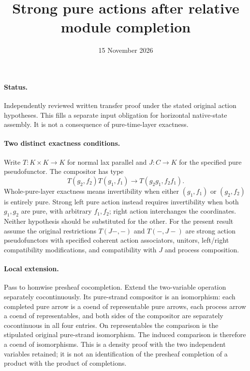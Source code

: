 \documentclass{article}
\title{Strong pure actions after relative module completion}
\date{15 November 2026}
\begin{document}
\maketitle
\paragraph{Status.} Independently reviewed written transfer proof under the stated original action hypotheses. This fills a separate input obligation for horizontal native-state assembly. It is not a consequence of pure-time-layer exactness.

\paragraph{Two distinct exactness conditions.} Write $T:K\times K\to K$ for normal lax parallel and $J:C\to K$ for the specified pure pseudofunctor. The compositor has type
\[
 T(g_2,f_2)T(g_1,f_1)\longrightarrow T(g_2g_1,f_2f_1).
\]
Whole-pure-layer exactness means invertibility when either $(g_1,f_1)$ or $(g_2,f_2)$ is entirely pure. Strong left pure action instead requires invertibility when both $g_1,g_2$ are pure, with arbitrary $f_1,f_2$; right action interchanges the coordinates. Neither hypothesis should be substituted for the other. For the present result assume the original restrictions $T(J-, -)$ and $T(-,J-)$ are strong action pseudofunctors with specified coherent action associators, unitors, left/right compatibility modifications, and compatibility with $J$ and process composition.

\paragraph{Local extension.} Pass to homwise presheaf cocompletion. Extend the two-variable operation separately cocontinuously. Its pure-strand compositor is an isomorphism: each completed pure arrow is a coend of representable pure arrows, each process arrow a coend of representables, and both sides of the compositor are separately cocontinuous in all four entries. On representables the comparison is the stipulated original pure-strand isomorphism. The induced comparison is therefore a coend of isomorphisms. This is a density proof with the two independent variables retained; it is not an identification of the presheaf completion of a product with the product of completions.
\end{document}
